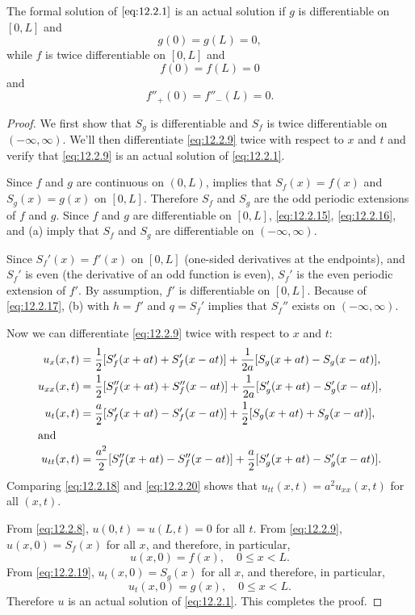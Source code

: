 \begin{theorem}\label{thmtype:12.2.4}
The formal solution of $\eqref{eq:12.2.1}$
is an actual solution if $g$ is differentiable on $[0,L]$
and
\begin{equation} \label{eq:12.2.15}
g(0)=g(L)=0,
\end{equation}
while $f$ is twice differentiable on $[0,L]$ and
\begin{equation} \label{eq:12.2.16}
f(0)=f(L)=0
\end{equation}
and
\begin{equation} \label{eq:12.2.17}
f''_+(0)=f''_-(L)=0.
\end{equation}
\end{theorem}

\begin{proof}
We first show that $S_g$ is differentiable and $S_f$
is twice differentiable on $(-\infty,\infty)$. We'll then
differentiate  \eqref{eq:12.2.9} twice with respect to $x$ and $t$
and verify that  \eqref{eq:12.2.9}  is an actual solution of \eqref{eq:12.2.1}.

Since  $f$ and $g$ are continuous on $(0,L)$,
  implies that
$S_f(x)=f(x)$ and $S_g(x)=g(x)$ on $[0,L]$. Therefore $S_f$
and $S_g$ are the odd periodic extensions  of $f$ and $g$.
 Since $f$ and $g$ are differentiable on $[0,L]$,
\eqref{eq:12.2.15},
\eqref{eq:12.2.16}, and  (a) imply that
$S_f$ and $S_g$ are differentiable on $(-\infty,\infty)$.

Since $S_f'(x)=f'(x)$ on $[0,L]$ (one-sided derivatives at the
endpoints), and
$S_f'$ is even
(the derivative of an odd function is even),
$S_f'$ is the even periodic extension of $f'$. By assumption, $f'$ is
differentiable on $[0,L]$. Because of \eqref{eq:12.2.17},
(b) with $h=f'$ and $q=S_f'$ implies that
$S_f''$ exists on $(-\infty,\infty)$.

Now we can differentiate \eqref{eq:12.2.9} twice with respect to $x$
and $t$:
\begin{align}
u_x(x,t)&=\frac{1}{2}[S_f'(x+at)+S_f'(x-at)]+
\frac{1}{2a}[S_g(x+at)-S_g(x-at)],\notag\\
\label{eq:12.2.18}
u_{xx}(x,t)&=\frac{1}{2}[S_f''(x+at)+S_f''(x-at)]+
\frac{1}{2a}[S_g'(x+at)-S_g'(x-at)],\\
\label{eq:12.2.19}
u_t(x,t)&=\frac{a}{2}[S_f'(x+at)-S_f'(x-at)]+
\frac{1}{2}[S_g(x+at)+S_g(x-at)],\\
\shortintertext{and}
\label{eq:12.2.20}
u_{tt}(x,t)&=\frac{a^2}{2}[S_f''(x+at)-S_f''(x-at)]+
\frac{a}{2}[S_g'(x+at)-S_g'(x-at)].
\end{align}
Comparing \eqref{eq:12.2.18}  and \eqref{eq:12.2.20} shows that
$u_{tt}(x,t)=a^2u_{xx}(x,t)$ for all $(x,t)$.

From \eqref{eq:12.2.8},  $u(0,t)=u(L,t)=0$
for all $t$. From \eqref{eq:12.2.9},
$u(x,0)=S_f(x)$ for all $x$, and therefore, in particular,
\[
u(x,0)=f(x),\quad 0\le x< L.
\]
 From \eqref{eq:12.2.19},
$u_t(x,0)=S_g(x)$ for all $x$, and therefore, in particular,
\[
u_t(x,0)=g(x),\quad 0\le x< L.
\]
Therefore $u$ is an actual solution of \eqref{eq:12.2.1}.
This completes the proof.
\end{proof}

